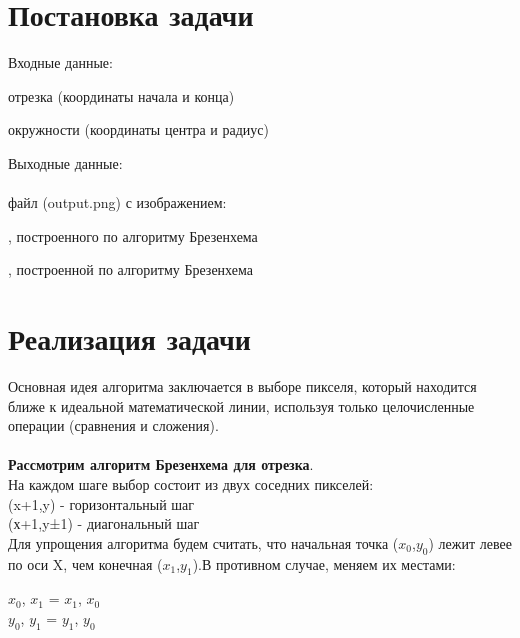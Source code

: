 \documentclass[a4paper, 12pt]{article}
\begin{document}
\section{Постановка задачи}

Входные данные:
\begin{itemize}
\setlength{\itemindent}{2cm}
 отрезка (координаты начала и конца)

 окружности (координаты центра и радиус)
\end{itemize}

Выходные данные:\\
\\
 файл (output.png) с изображением:
\begin{itemize}
\setlength{\itemindent}{1cm}

, построенного по алгоритму Брезенхема

, построенной по алгоритму Брезенхема
\end{itemize}





\newpage
\section{Реализация задачи}

Основная идея алгоритма заключается в выборе пикселя, который находится ближе к идеальной математической линии, используя только целочисленные операции (сравнения и сложения).\\
\\
\textbf{Рассмотрим алгоритм Брезенхема для отрезка}.\\
На каждом шаге выбор состоит из двух соседних пикселей: \\
(x+1,y) - горизонтальный шаг\\
(х+1,y±1) - диагональный шаг\\
Для упрощения алгоритма будем считать, что начальная точка ($x_0$,$y_0$) лежит левее по оси X, чем конечная ($x_1$,$y_1$).В противном случае, меняем их местами:
\begin{center}
    $x_0$, $x_1$ = $x_1$, $x_0$ \\
 $y_0$, $y_1$ = $y_1$, $y_0$\\
\end{center}
 
\end{document}
